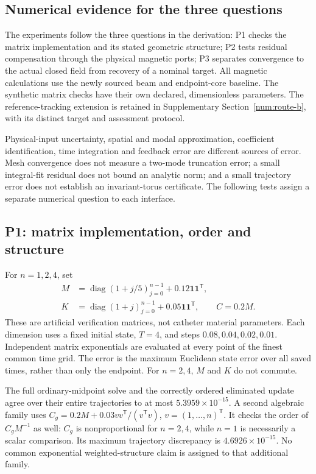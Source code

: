 \subsection{Numerical evidence for the three questions}
\label{num:scope}
The experiments follow the three questions in the derivation: P1 checks
the matrix implementation and its stated geometric structure; P2 tests
residual compensation through the physical magnetic ports; P3 separates
convergence to the actual closed field from recovery of a nominal target.
All magnetic calculations use the newly sourced beam and endpoint-core
baseline. The synthetic matrix checks have their own declared,
dimensionless parameters. The reference-tracking extension is retained
in Supplementary Section~\ref{num:route-b}, with its distinct target and
assessment protocol.

Physical-input uncertainty, spatial and modal approximation, coefficient
identification, time integration and feedback error are different sources
of error. Mesh convergence does not measure a two-mode truncation error;
a small integral-fit residual does not bound an analytic norm; and a
small trajectory error does not establish an invariant-torus certificate.
The following tests assign a separate numerical question to each interface.

\subsection{P1: matrix implementation, order and structure}
\label{num:p1}
For $n=1,2,4$, set
\begin{equation}
 \begin{split}
 M&=\operatorname{diag}(1+j/5)_{j=0}^{n-1}
       +0.12\boldsymbol1\boldsymbol1^{\mathsf T},\\
 K&=\operatorname{diag}(1+j)_{j=0}^{n-1}
       +0.05\boldsymbol1\boldsymbol1^{\mathsf T},\qquad C=0.2M.
 \end{split}
 \label{num:matrix-data}
\end{equation}
These are artificial verification matrices, not catheter material
parameters. Each dimension uses a fixed initial state, $T=4$, and steps
$0.08,0.04,0.02,0.01$. Independent matrix exponentials are evaluated at
every point of the finest common time grid. The error is the maximum
Euclidean state error over all saved times, rather than only the endpoint.
For $n=2,4$, $M$ and $K$ do not commute.

The full ordinary-midpoint solve and the correctly ordered eliminated
update agree over their entire trajectories to at most
$5.3959\times10^{-15}$. A second algebraic family uses
$C_g=0.2M+0.03vv^{\mathsf T}/(v^{\mathsf T}v)$, $v=(1,\ldots,n)^{\mathsf T}$.
It checks the order of $C_gM^{-1}$ as well: $C_g$ is nonproportional for
$n=2,4$, while $n=1$ is necessarily a scalar comparison. Its maximum
trajectory discrepancy is $4.6926\times10^{-15}$. No common exponential
weighted-structure claim is assigned to that additional family.

